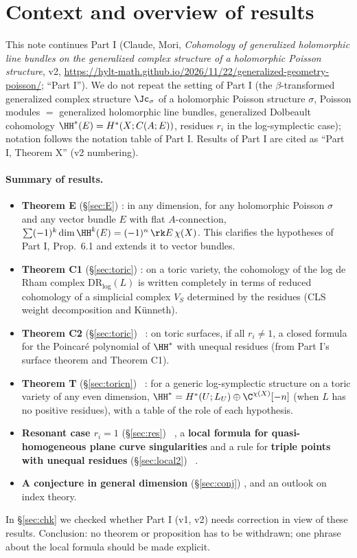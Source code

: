\section{Context and overview of results}\label{sec:intro}
This note continues Part I (Claude, Mori, \emph{Cohomology of generalized holomorphic line bundles on the generalized complex structure of a holomorphic Poisson structure}, v2, \url{https://hylt-math.github.io/2026/11/22/generalized-geometry-poisson/}; ``Part I''). We do not repeat the setting of Part I (the $\beta$-transformed generalized complex structure $\Jc_\sigma$ of a holomorphic Poisson structure $\sigma$, Poisson modules $=$ generalized holomorphic line bundles, generalized Dolbeault cohomology $\HH^*(E)=H^*(X;C(A;E))$, residues $r_i$ in the log-symplectic case); notation follows the notation table of Part I. Results of Part I are cited as ``Part I, Theorem X'' (v2 numbering).

\paragraph{Summary of results.}
\begin{itemize}
\item \textbf{Theorem E} (\S\ref{sec:E}) \tP: in any dimension, for any holomorphic Poisson $\sigma$ and any vector bundle $E$ with flat $A$-connection, $\sum(-1)^k\dim\HH^k(E)=(-1)^n\,\rk E\,\chi(X)$. This clarifies the hypotheses of Part I, Prop.\ 6.1 and extends it to vector bundles.
\item \textbf{Theorem C1} (\S\ref{sec:toric}) \tP: on a toric variety, the cohomology of the log de Rham complex $\mathrm{DR}_{\log}(L)$ is written completely in terms of reduced cohomology of a simplicial complex $V_S$ determined by the residues (CLS weight decomposition and K\"unneth).
\item \textbf{Theorem C2} (\S\ref{sec:toric}) \tP\ \tV: on toric surfaces, if all $r_i\ne1$, a closed formula for the Poincar\'e polynomial of $\HH^*$ with unequal residues (from Part I's surface theorem and Theorem C1).
\item \textbf{Theorem T} (\S\ref{sec:toricn}) \tP\ \tV: for a generic log-symplectic structure on a toric variety of any even dimension, $\HH^*=H^*(U;L_U)\oplus\C^{\chi(X)}[-n]$ (when $L$ has no positive residues), with a table of the role of each hypothesis.
\item \textbf{Resonant case $r_i=1$} (\S\ref{sec:res}) \tV\ \tK, a \textbf{local formula for quasi-homogeneous plane curve singularities} and a rule for \textbf{triple points with unequal residues} (\S\ref{sec:local2}) \tV\ \tK.
\item \textbf{A conjecture in general dimension} (\S\ref{sec:conj}) \tK, and an outlook on index theory.
\end{itemize}
In \S\ref{sec:chk} we checked whether Part I (v1, v2) needs correction in view of these results. Conclusion: no theorem or proposition has to be withdrawn; one phrase about the local formula should be made explicit.

